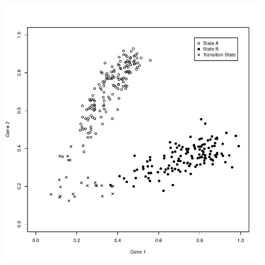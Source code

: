 \documentclass{article}\usepackage[]{graphicx}\usepackage[]{color}
\makeatletter
\def\maxwidth{ %
  \ifdim\Gin@nat@width>\linewidth
    \linewidth
  \else
    \Gin@nat@width
  \fi
}
\newenvironment{knitrout}{}{} %
\makeatother
\begin{document}
\begin{knitrout}
{\centering \includegraphics[width=\maxwidth]{figure/plots-1} 

}



\end{knitrout}
\end{document}
